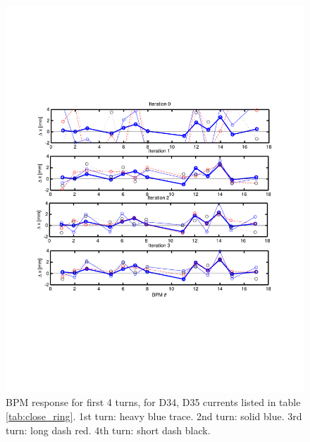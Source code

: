 \begin{figure}[htb]
\centering
\includegraphics[width=\textwidth,trim={.5in 2.7in .5in 2.7in},clip]{4.figures/closing_orbit_BPMs.pdf}
\caption{BPM response for first 4 turns, for D34, D35 currents listed in table \ref{tab:close_ring}. 1st turn: heavy blue trace. 2nd turn: solid blue. 3rd turn: long dash red. 4th turn: short dash black.}
\label{fig:close_BPMs}
\end{figure}

